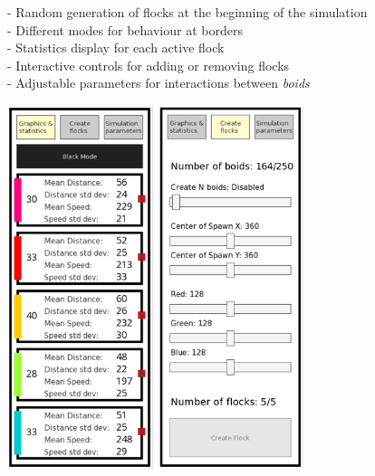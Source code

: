 \documentclass[10pt,a4paper]{article}
\begin{document}

- Random generation of flocks at the beginning of the simulation \\
- Different modes for behaviour at borders \\
- Statistics display for each active flock \\
- Interactive controls for adding or removing flocks \\
- Adjustable parameters for interactions between \textit{boids} \\

\begin{center}
    \includegraphics[width=0.32\textwidth]{../images/option1.png}
    \includegraphics[width=0.32\textwidth]{../images/option2.png}

\end{center}
\end{document}
